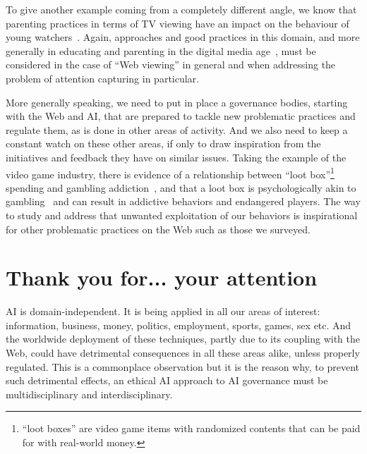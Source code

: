 \documentclass[10pt]{article}
\begin{document}
To give another example coming from a completely different angle, we know that parenting practices in terms of TV viewing have an impact on the behaviour of young watchers~\cite{BARRADAS2007369}. Again, approaches and good practices in this domain, and more generally in educating and parenting in the digital media age~\cite{coyne2017}, must be considered in the case of ``Web viewing'' in general and when addressing the problem of attention capturing in particular.


More generally speaking, we need to put in place a governance bodies, starting with the Web and AI, that are prepared to tackle new problematic practices and regulate them, as is done in other areas of activity. 
And we also need to keep a constant watch on these other areas, if only to draw inspiration from the initiatives and feedback they have on similar issues. 
Taking the example of the video game industry, there is evidence of a relationship between ``loot box''\footnote{``loot boxes'' are video game items with randomized contents that can be paid for with real-world money.} spending and gambling addiction~\cite{zendle2018video}, and that a loot box is psychologically akin to gambling~\cite{drummond2018video} and can result in addictive behaviors and endangered players.
The way to study and address that unwanted exploitation of our behaviors is inspirational for other problematic practices on the Web such as those we surveyed.



\section{Thank you for... your attention} 
\label{sec:thankyou}

AI is domain-independent. It is being applied in all our areas of interest: information, business, money, politics, employment, sports, games, sex etc. 
And the worldwide deployment of these techniques, partly due to its coupling with the Web, could have detrimental consequences in all these areas alike, unless properly regulated.
This is a commonplace observation but it is the reason why, to prevent such detrimental effects, an ethical AI approach to AI governance must be multidisciplinary and interdisciplinary.
\end{document}
